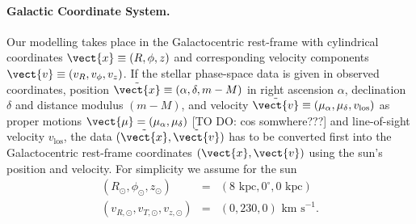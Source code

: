 \paragraph{Galactic Coordinate System.} Our modelling takes place in the Galactocentric rest-frame with cylindrical coordinates $\vect{x} \equiv (R,\phi,z)$ and corresponding velocity components $\vect{v} \equiv (v_R,v_\phi,v_z)$. If the stellar phase-space data is given in observed coordinates, position $\tilde{\vect{x}} \equiv(\alpha,\delta,m-M)$ in right ascension $\alpha$, declination $\delta$ and distance modulus $(m-M)$, and velocity $\tilde{\vect{v}} \equiv (\mu_\alpha,\mu_\delta,v_\text{los})$ as proper motions $\vect{\mu}=(\mu_\alpha,\mu_\delta)$ [TO DO: cos somwhere???] and line-of-sight velocity $v_\text{los}$, the data $(\tilde{\vect{x}},\tilde{\vect{v}})$ has to be converted first into the Galactocentric rest-frame coordinates $(\vect{x},\vect{v})$ using the sun's position and velocity. For simplicity we assume for the sun
\begin{eqnarray*}
(R_\odot,\phi_\odot,z_\odot) &=&(8 \text{ kpc}, 0^\circ, 0 \text{ kpc})\\
(v_{R,\odot},v_{T,\odot},v_{z,\odot}) &=& (0,230,0) \text{ km s}^{-1}.
\end{eqnarray*}

